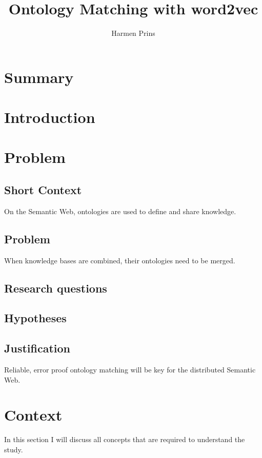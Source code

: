 \documentclass{article}
\title{Ontology Matching with word2vec}
\author{Harmen Prins}
\begin{document}
 \maketitle
 
 \section*{Summary}
 
 \tableofcontents
 
 \section{Introduction}

 \section{Problem}
 \subsection{Short Context}
 On the Semantic Web, ontologies are used to define and share knowledge.
 \subsection{Problem}
 When knowledge bases are combined, their ontologies need to be merged.
 \subsection{Research questions}
 
 \subsection{Hypotheses}
 
 \subsection{Justification}
 Reliable, error proof ontology matching will be key for the distributed Semantic Web.
 
 \section{Context}
 In this section I will discuss all concepts that are required to understand the study.
\end{document}
